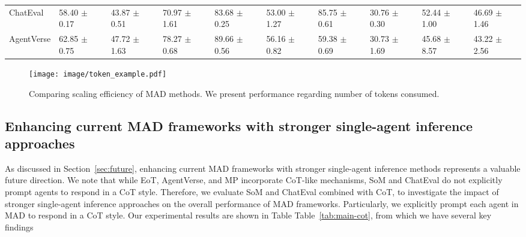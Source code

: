 \begin{table*}[htbp]
{\begin{tabular}{l|lllllllll}
ChatEval & \cellcolor{LightBlue}58.40 $\pm$ 0.17 & \cellcolor{LightBlue}43.87 $\pm$ 0.51 & \cellcolor{LightBlue}70.97 $\pm$ 1.61 & \cellcolor{LightBlue}83.68 $\pm$ 0.25 & \cellcolor{LightRed}53.00 $\pm$ 1.27 & \cellcolor{LightBlue}85.75 $\pm$ 0.61 & \cellcolor{LightRed}30.76 $\pm$ 0.30 & \cellcolor{LightBlue}52.44 $\pm$ 1.00 & \cellcolor{LightBlue}46.69 $\pm$ 1.46 \\
AgentVerse & \cellcolor{LightRed}62.85 $\pm$ 0.75 & \cellcolor{LightRed}47.72 $\pm$ 1.63 & \cellcolor{LightBlue}78.27 $\pm$ 0.68 & \cellcolor{LightRed}89.66 $\pm$ 0.56 & \cellcolor{LightRed}56.16 $\pm$ 0.82 & \cellcolor{LightBlue}59.38 $\pm$ 0.69 & \cellcolor{LightRed}30.73 $\pm$ 1.69 & \cellcolor{LightBlue}45.68 $\pm$ 8.57 & \cellcolor{LightBlue}43.22 $\pm$ 2.56 \\
\hline
\end{tabular}}
\end{table*}

\begin{figure}[htbp]
    \centering
    \texttt{[image: image/token\_example.pdf]}
    \caption{Comparing scaling efficiency of MAD methods. We present performance regarding number of tokens consumed.}
    \label{fig:token_scale}
\end{figure}

\subsection{Enhancing current MAD frameworks with stronger single-agent inference approaches} \label{appendix:cot}
As discussed in Section~\ref{sec:future}, enhancing current MAD frameworks with stronger single-agent inference methods represents a valuable future direction. We note that while EoT, AgentVerse, and MP incorporate CoT-like mechanisms, SoM and ChatEval do not explicitly prompt agents to respond in a CoT style. Therefore, we evaluate SoM and ChatEval combined with CoT, to investigate the impact of stronger single-agent inference approaches on the overall performance of MAD frameworks. Particularly, we explicitly prompt each agent in MAD to respond in a CoT style. Our experimental results are shown in Table Table~\ref{tab:main-cot}, from which we have several key findings

